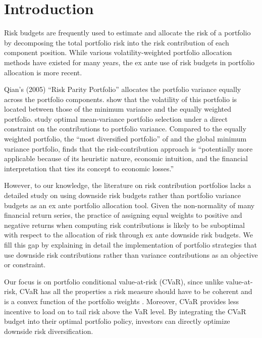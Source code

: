 \documentclass[12pt,a4paper]{article}
\renewcommand{\baselinestretch}{1.3}
\begin{document}

\newpage
\renewcommand{\baselinestretch}{1.3}

\section{Introduction}

Risk budgets are frequently used to estimate and allocate the risk of a portfolio by decomposing the total portfolio risk into the risk contribution of each component position.  While various volatility-weighted portfolio allocation methods have existed for many years, the ex ante use of risk budgets in portfolio allocation is more recent.

\nocite{Qian2005} Qian's (2005) ``Risk Parity Portfolio'' allocates the portfolio variance equally across the portfolio components. \citet{Maillard2010} show that the volatility of this portfolio is located between those of the minimum variance and the equally weighted portfolio. \citet{Zhu2010} study optimal mean-variance portfolio selection under a direct constraint on the contributions to portfolio variance. Compared to the equally weighted portfolio, the ``most diversified portfolio'' of \citet{MDP2008} and the global minimum variance portfolio, \citet{Lee2011} finds that the risk-contribution approach is ``potentially more applicable because of its heuristic nature, economic intuition, and the financial interpretation that ties its concept to economic losses.''

However, to our knowledge, the literature on risk contribution portfolios lacks a detailed study on using downside risk budgets rather than portfolio variance budgets as an ex ante portfolio allocation tool. Given the non-normality of many financial return series, the practice of assigning equal weights to positive and negative returns when computing risk contributions is likely to be suboptimal with respect to the allocation of risk through ex ante downside risk budgets. We fill this gap by explaining in detail the implementation of portfolio strategies that use downside risk contributions rather than variance contributions as an objective or constraint.

Our focus is on portfolio conditional value-at-risk (CVaR), since unlike value-at-risk, CVaR has all the properties a risk measure should have to be coherent and is a convex function of the portfolio weights \citep{Artzner1999, Pflug2000}. Moreover, CVaR provides less incentive to load on to tail risk above the VaR level. By integrating the CVaR budget into their optimal portfolio policy, investors can directly optimize downside risk diversification.
\end{document}

